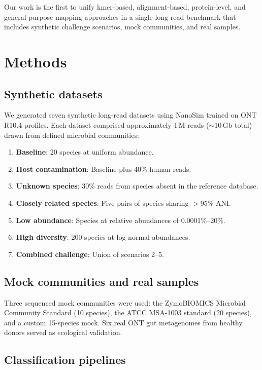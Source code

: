 \documentclass[12pt]{article}
\begin{document}
Our work is the first to unify kmer-based, alignment-based, protein-level, and general-purpose mapping approaches in a single long-read benchmark that includes synthetic challenge scenarios, mock communities, and real samples.

\section{Methods}

\subsection{Synthetic datasets}

We generated seven synthetic long-read datasets using NanoSim \citep{yang2017nanosim} trained on ONT R10.4 profiles. Each dataset comprised approximately 1\,M reads ($\sim$10\,Gb total) drawn from defined microbial communities:

\begin{enumerate}
    \item \textbf{Baseline}: 20 species at uniform abundance.
    \item \textbf{Host contamination}: Baseline plus 40\% human reads.
    \item \textbf{Unknown species}: 30\% reads from species absent in the reference database.
    \item \textbf{Closely related species}: Five pairs of species sharing $>$95\% ANI.
    \item \textbf{Low abundance}: Species at relative abundances of 0.0001\%--20\%.
    \item \textbf{High diversity}: 200 species at log-normal abundances.
    \item \textbf{Combined challenge}: Union of scenarios 2--5.
\end{enumerate}

\subsection{Mock communities and real samples}

Three sequenced mock communities were used: the ZymoBIOMICS Microbial Community Standard (10 species), the ATCC MSA-1003 standard (20 species), and a custom 15-species mock. Six real ONT gut metagenomes from healthy donors served as ecological validation.

\subsection{Classification pipelines}
\end{document}
